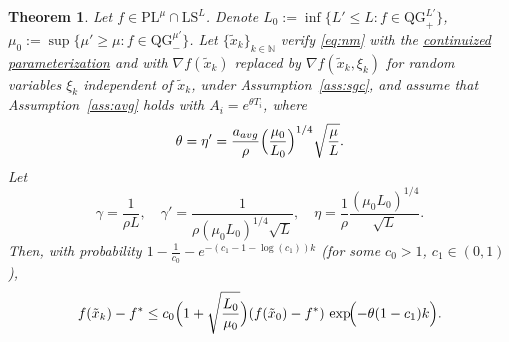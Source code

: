 \documentclass{article}
\def\N{{\mathbb{N}}}
\def\xdisctilde{\{\tilde{x}_k \}_{k\in \N}}
\def\pl{{\text{PL}^\mu}}
\newcommand{\bpar}[1]{\left(#1\right)}
\newcommand{\E}[1]{\mathbb{E}\left[#1 \right]}
\newcommand{\norm}[1]{\left\lVert#1\right\rVert}
\newcommand{\ls}{\text{LS}^{L}}
\newcommand{\qgf}[1]{\text{QG}_{+}^{#1}}
\newcommand{\qginff}[1]{\text{QG}_{-}^{#1}}
\theoremstyle{plain}
\newtheorem{theorem}{Theorem}[section]
\theoremstyle{definition}
\theoremstyle{remark}
\begin{document}




\begin{theorem}\label{thm:pl_accel_avg}
Let $f\in \pl \cap \ls$. Denote
$L_0 := \inf \{L'\le L:  f \in \qgf{L'} \}$,
$\mu_0 := \sup\{\mu' \ge \mu : f \in \qginff{\mu'}\}$.
Let $\xdisctilde$ verify \eqref{eq:nm} with the \hyperlink{cont_param}{continuized parameterization} and with
$\nabla f(\tilde x_k)$ replaced by $\nabla f(\tilde x_k,\xi_k)$ for random variables $\xi_k$ independent of $\tilde x_k$,
under Assumption~\ref{ass:sgc}, and assume that Assumption~\ref{ass:avg} holds with $A_i = e^{\theta T_i}$, where
\[
\theta = \eta' = \frac{a_{avg}}{\rho}\Bigl(\frac{\mu_0}{L_0}\Bigr)^{1/4}\sqrt{\frac{\mu}{L}}.
\]
Let
\[
\gamma = \frac{1}{\rho L},
\quad
\gamma' = \frac{1}{\rho(\mu_0 L_0)^{1/4}\sqrt{L}},
\quad
\eta = \frac{1}{\rho}\frac{(\mu_0 L_0)^{1/4}}{\sqrt{L}}.
\]
Then, with probability $1-\frac{1}{c_0} - e^{-(c_1-1-\log(c_1))k}$ (for some $c_0>1$, $c_1\in(0,1)$),
\[
f(\tilde x_k)-f^\ast \le c_0\Bigl(1+\sqrt{\frac{L_0}{\mu_0}}\Bigr)(f(\tilde x_0)-f^\ast)\,
\exp\!\Bigl(-\theta(1-c_1)k\Bigr).
\]
\end{theorem}
\end{document}
